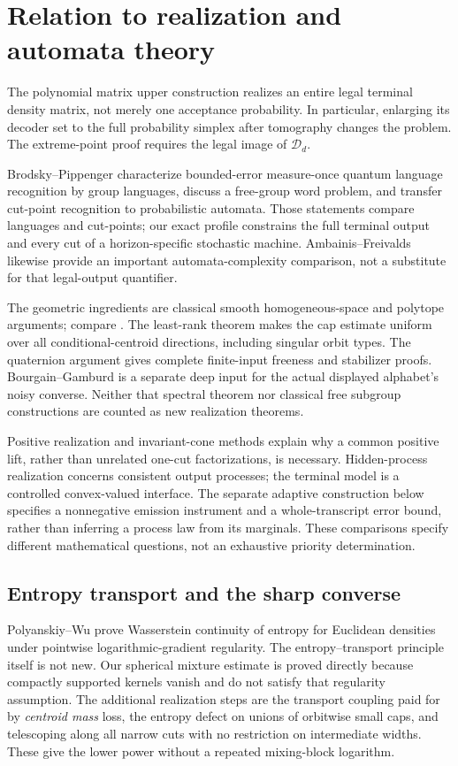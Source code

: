\section{Relation to realization and automata theory}
The polynomial matrix upper construction realizes an entire legal
terminal density matrix, not merely one acceptance probability. In
particular, enlarging its decoder set to the full probability simplex
after tomography changes the problem. The extreme-point proof requires
the legal image of $\mathcal D_d$.

Brodsky--Pippenger \cite[Theorems~3.3 and 3.6; Lemma~3.5]{BP} characterize
bounded-error measure-once quantum language recognition by group
languages, discuss a free-group word problem, and transfer cut-point
recognition to probabilistic automata. Those statements compare languages
and cut-points; our exact profile constrains the full terminal output and
every cut of a horizon-specific stochastic machine. Ambainis--Freivalds
\cite{AF57} likewise provide an important automata-complexity comparison,
not a substitute for that legal-output quantifier.

The geometric ingredients are classical smooth homogeneous-space and
polytope arguments; compare \cite{Hall,Szarek57}. The least-rank theorem
makes the cap estimate uniform over all conditional-centroid directions,
including singular orbit types. The quaternion argument gives complete
finite-input freeness and stabilizer proofs. Bourgain--Gamburd
\cite[Theorem~1]{BG2012} is a separate deep input for the actual displayed
alphabet's noisy converse. Neither that spectral theorem nor classical
free subgroup constructions are counted as new realization theorems.

Positive realization and invariant-cone methods \cite{BF04,BR} explain
why a common positive lift, rather than unrelated one-cut factorizations,
is necessary. Hidden-process realization \cite{Heller58} concerns
consistent output processes; the terminal model is a controlled convex-valued interface. The
separate adaptive construction below specifies a nonnegative emission
instrument and a whole-transcript error bound, rather than inferring
a process law from its marginals. These
comparisons specify different mathematical questions, not an exhaustive
priority determination.

\subsection{Entropy transport and the sharp converse}
Polyanskiy--Wu \cite[Proposition~1]{PW61} prove Wasserstein continuity
of entropy for Euclidean densities under pointwise logarithmic-gradient
regularity. The entropy--transport principle itself is not new. Our
spherical mixture estimate is proved directly because compactly
supported kernels vanish and do not satisfy that regularity assumption.
The additional realization steps are the transport coupling paid for
by \emph{centroid mass} loss, the entropy defect on unions of orbitwise
small caps, and telescoping along all narrow cuts with no restriction
on intermediate widths. These give the lower power without a repeated
mixing-block logarithm.

